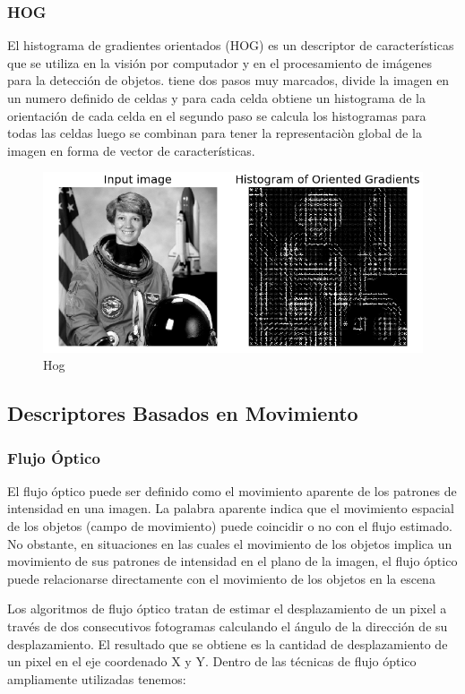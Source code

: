 \documentclass[a4paper,11pt]{report}
\begin{document}
\subsubsection{HOG}
El histograma de gradientes orientados (HOG) es un descriptor de características que se utiliza en la visión por computador y en el procesamiento de imágenes para la detección de objetos. tiene dos pasos muy marcados, divide la imagen en un
numero definido de celdas y para cada celda obtiene un histograma de la orientación de cada celda
en el segundo paso  se calcula los histogramas para todas las celdas
luego se combinan para tener la representaciòn global de la imagen en forma de vector de características. 

\begin{figure}[h]
	\centering
	\includegraphics[scale=0.4]{hog.png}
	\caption{Hog}
	\label{fig:Hog}
\end{figure}



\subsection{Descriptores Basados en Movimiento}
\subsubsection{Flujo Óptico}
El flujo óptico puede ser definido como el movimiento aparente de los patrones de intensidad en una imagen. La palabra aparente indica que el movimiento espacial de los objetos (campo de movimiento) puede coincidir o no con el flujo estimado. No obstante, en situaciones en las cuales el movimiento de los objetos implica un movimiento de sus patrones de intensidad en el plano de la imagen, el flujo óptico puede relacionarse directamente con el movimiento de los objetos en la escena

Los algoritmos de flujo óptico tratan de estimar el desplazamiento de un pixel a través de dos consecutivos fotogramas calculando el ángulo de la dirección de su desplazamiento. El resultado que se obtiene es la cantidad de desplazamiento de un pixel en el eje coordenado X y Y.
Dentro de las técnicas de flujo óptico ampliamente utilizadas tenemos:
\end{document}
